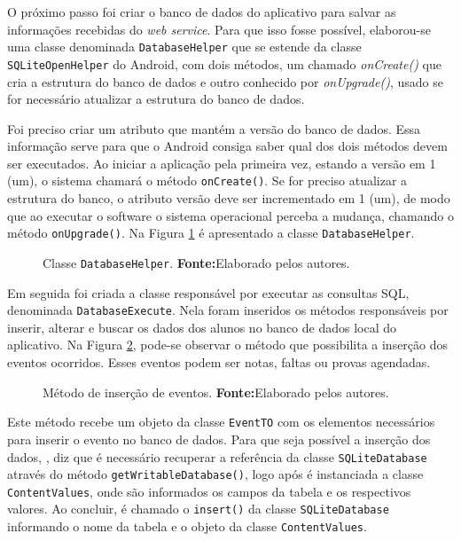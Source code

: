 	\par O próximo passo foi criar o banco de dados do aplicativo para salvar as
informações recebidas do \textit{web service}. Para que isso fosse possível,
elaborou-se uma classe denominada \texttt{DatabaseHelper} que se estende da
classe \texttt{SQLiteOpenHelper} do Android, com dois métodos, um chamado
\textit{onCreate()} que cria a estrutura do banco de dados e outro conhecido
por \textit{onUpgrade()}, usado se for necessário atualizar a estrutura do
banco de dados.

	\par Foi preciso criar um atributo que mantém a versão do banco de dados. Essa
informação serve para que o Android consiga saber qual dos dois métodos devem
ser executados. Ao iniciar a aplicação pela primeira vez, estando a versão em 1
(um), o sistema chamará o método \texttt{onCreate()}. Se for preciso atualizar
a estrutura do banco, o atributo versão deve ser incrementado em 1 (um), de
modo que ao executar o software o sistema operacional perceba a mudança,
chamando o método \texttt{onUpgrade()}. Na Figura \ref{fig:app5} é apresentado a
classe \texttt{DatabaseHelper}.

	\begin{figure}[h!] 
		
		\caption[Classe DatabaseHelper]{Classe \texttt{DatabaseHelper}.
		\textbf{Fonte:}Elaborado pelos autores.}
		\label{fig:app5}
	\end{figure}
	
	\par Em seguida foi criada a classe responsável por executar as consultas SQL,
denominada \texttt{DatabaseExecute}. Nela foram inseridos os métodos
responsáveis por inserir, alterar e buscar os dados dos alunos no banco de
dados local do aplicativo. Na Figura \ref{fig:app6}, pode-se observar o método
que possibilita a inserção dos eventos ocorridos. Esses eventos podem ser
notas, faltas ou provas agendadas.
	
	
	\begin{figure}[h!] 
		
		\caption[Método de inserção de eventos]{Método de inserção de eventos.
		\textbf{Fonte:}Elaborado pelos autores.}
		\label{fig:app6}
	\end{figure}
	
	\pagebreak
	
	\par Este método recebe um objeto da classe \texttt{EventTO} com os elementos
necessários para inserir o evento no banco de dados. Para que seja possível a
inserção dos dados, , diz que é necessário
recuperar a referência da classe \texttt{SQLiteDatabase} através do método
\texttt{getWritableDatabase()}, logo após é instanciada a classe
\texttt{ContentValues}, onde são informados os campos da tabela e os
respectivos valores. Ao concluir, é chamado o \texttt{insert()} da classe
\texttt{SQLiteDatabase} informando o nome da tabela e o objeto da classe
\texttt{ContentValues}.

